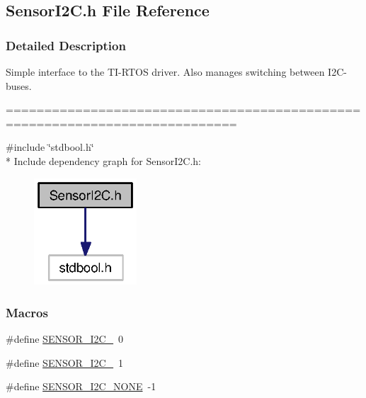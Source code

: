 \subsection{Sensor\+I2\+C.\+h File Reference}
\label{_sensor_i2_c_8h}


\subsubsection{Detailed Description}
Simple interface to the T\+I-\/\+R\+T\+O\+S driver. Also manages switching between I2\+C-\/buses. 

============================================================================



{\ttfamily \#include \char`\"{}stdbool.\+h\char`\"{}}\\*
Include dependency graph for Sensor\+I2\+C.\+h\+:
\nopagebreak
\begin{figure}[H]
\begin{center}
\leavevmode
\includegraphics[width=109pt]{_sensor_i2_c_8h__incl}
\end{center}
\end{figure}
\subsubsection*{Macros}
\begin{DoxyCompactItemize}
\item 
\#define \hyperlink{_sensor_i2_c_8h_aa9cbb511d4299a3bc389624737c2b171}{S\+E\+N\+S\+O\+R\+\_\+\+I2\+C\+\_}~0
\item 
\#define \hyperlink{_sensor_i2_c_8h_afed3d0515650aa6426fbfbf6bd6920d7}{S\+E\+N\+S\+O\+R\+\_\+\+I2\+C\+\_}~1
\item 
\#define \hyperlink{_sensor_i2_c_8h_a2d6c3813be4719d93226389684c32a38}{S\+E\+N\+S\+O\+R\+\_\+\+I2\+C\+\_\+\+N\+O\+N\+E}~-\/1
\end{DoxyCompactItemize}
